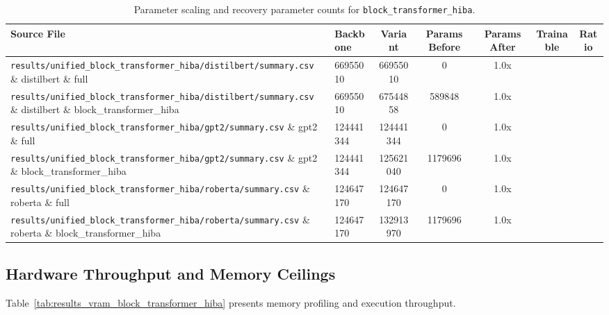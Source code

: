 \begin{table}[t]
\centering
\small
\begin{tabularx}{\linewidth}{llccccc}
\toprule
\textbf{Source File} & \textbf{Backbone} & \textbf{Variant} & \textbf{Params Before} & \textbf{Params After} & \textbf{Trainable} & \textbf{Ratio} \\
\midrule
\texttt{results/unified\_block\_transformer\_hiba/distilbert/summary.csv} \& distilbert \& full & 66955010 & 66955010 & 0 & 1.0x \\
\texttt{results/unified\_block\_transformer\_hiba/distilbert/summary.csv} \& distilbert \& block\_transformer\_hiba & 66955010 & 67544858 & 589848 & 1.0x \\
\texttt{results/unified\_block\_transformer\_hiba/gpt2/summary.csv} \& gpt2 \& full & 124441344 & 124441344 & 0 & 1.0x \\
\texttt{results/unified\_block\_transformer\_hiba/gpt2/summary.csv} \& gpt2 \& block\_transformer\_hiba & 124441344 & 125621040 & 1179696 & 1.0x \\
\texttt{results/unified\_block\_transformer\_hiba/roberta/summary.csv} \& roberta \& full & 124647170 & 124647170 & 0 & 1.0x \\
\texttt{results/unified\_block\_transformer\_hiba/roberta/summary.csv} \& roberta \& block\_transformer\_hiba & 124647170 & 132913970 & 1179696 & 1.0x \\
\bottomrule
\end{tabularx}
\caption{Parameter scaling and recovery parameter counts for \texttt{block\_transformer\_hiba}.}
\label{tab:results_params_block_transformer_hiba}
\end{table}

\subsection{Hardware Throughput and Memory Ceilings}
Table~\ref{tab:results_vram_block_transformer_hiba} presents memory profiling and execution throughput.


